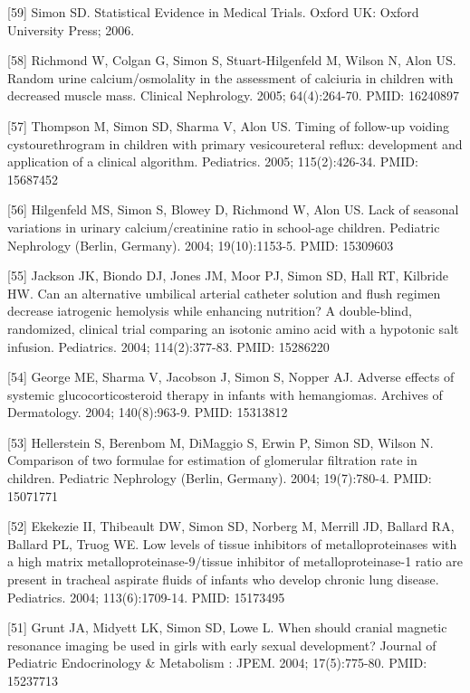 \documentclass[
  12pt,
]{article}
\begin{document}
{[}59{]} Simon SD. Statistical Evidence in Medical Trials. Oxford UK:
Oxford University Press; 2006.

{[}58{]} Richmond W, Colgan G, Simon S, Stuart-Hilgenfeld M, Wilson N,
Alon US. Random urine calcium/osmolality in the assessment of calciuria
in children with decreased muscle mass. Clinical Nephrology. 2005;
64(4):264-70. PMID: 16240897

{[}57{]} Thompson M, Simon SD, Sharma V, Alon US. Timing of follow-up
voiding cystourethrogram in children with primary vesicoureteral reflux:
development and application of a clinical algorithm. Pediatrics. 2005;
115(2):426-34. PMID: 15687452

{[}56{]} Hilgenfeld MS, Simon S, Blowey D, Richmond W, Alon US. Lack of
seasonal variations in urinary calcium/creatinine ratio in school-age
children. Pediatric Nephrology (Berlin, Germany). 2004; 19(10):1153-5.
PMID: 15309603

{[}55{]} Jackson JK, Biondo DJ, Jones JM, Moor PJ, Simon SD, Hall RT,
Kilbride HW. Can an alternative umbilical arterial catheter solution and
flush regimen decrease iatrogenic hemolysis while enhancing nutrition? A
double-blind, randomized, clinical trial comparing an isotonic amino
acid with a hypotonic salt infusion. Pediatrics. 2004; 114(2):377-83.
PMID: 15286220

{[}54{]} George ME, Sharma V, Jacobson J, Simon S, Nopper AJ. Adverse
effects of systemic glucocorticosteroid therapy in infants with
hemangiomas. Archives of Dermatology. 2004; 140(8):963-9. PMID: 15313812

{[}53{]} Hellerstein S, Berenbom M, DiMaggio S, Erwin P, Simon SD,
Wilson N. Comparison of two formulae for estimation of glomerular
filtration rate in children. Pediatric Nephrology (Berlin, Germany).
2004; 19(7):780-4. PMID: 15071771

{[}52{]} Ekekezie II, Thibeault DW, Simon SD, Norberg M, Merrill JD,
Ballard RA, Ballard PL, Truog WE. Low levels of tissue inhibitors of
metalloproteinases with a high matrix metalloproteinase-9/tissue
inhibitor of metalloproteinase-1 ratio are present in tracheal aspirate
fluids of infants who develop chronic lung disease. Pediatrics. 2004;
113(6):1709-14. PMID: 15173495

{[}51{]} Grunt JA, Midyett LK, Simon SD, Lowe L. When should cranial
magnetic resonance imaging be used in girls with early sexual
development? Journal of Pediatric Endocrinology \& Metabolism : JPEM.
2004; 17(5):775-80. PMID: 15237713
\end{document}
